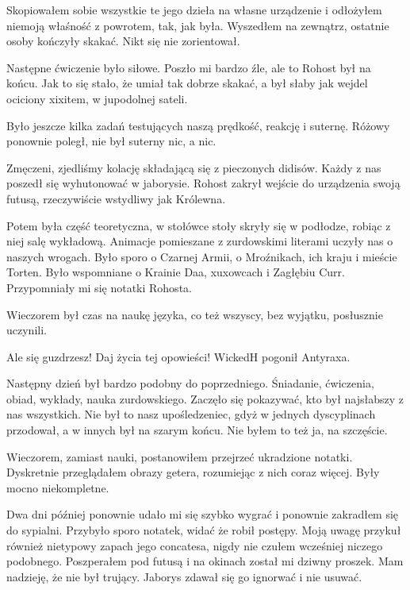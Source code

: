 Skopiowałem sobie wszystkie te jego dzieła na własne urządzenie i odłożyłem niemoją właśność z powrotem, tak, jak była.
Wyszedłem na zewnątrz, ostatnie osoby kończyły skakać. Nikt się nie zorientował.

Następne ćwiczenie było siłowe. 
Poszło mi bardzo źle, ale to Rohost był na końcu.
Jak to się stało, że umiał tak dobrze skakać, a był słaby jak wejdel ociciony xixitem, w jupodolnej sateli.

Było jeszcze kilka zadań testujących naszą prędkość, reakcję i suternę.
Różowy ponownie poległ, nie był suterny nic, a nic.

Zmęczeni, zjedliśmy kolację składającą się z pieczonych didisów.
Każdy z nas poszedł się wyhutonować w jaborysie.
Rohost zakrył wejście do urządzenia swoją futusą, rzeczywiście wstydliwy jak Królewna.

Potem była część teoretyczna, w stołówce stoły skryły się w podłodze, robiąc z niej salę wykładową.
Animacje pomieszane z zurdowskimi literami uczyły nas o naszych wrogach.
Było sporo o Czarnej Armii, o Mroźnikach, ich kraju i mieście Torten. Było wspomniane o Krainie Daa, xuxowcach i Zagłębiu Curr.
Przypomniały mi się notatki Rohosta.

Wieczorem był czas na naukę języka, co też wszyscy, bez wyjątku, posłusznie uczynili.

\divider{}

\begin{dialogue}
\ds{} Ale się guzdrzesz! Daj życia tej opowieści! \dm{} WickedH pogonił Antyraxa.
\end{dialogue}

\divider{}

Następny dzień był bardzo podobny do poprzedniego.
Śniadanie, ćwiczenia, obiad, wykłady, nauka zurdowskiego.
Zaczęło się pokazywać, kto był najsłabszy z nas wszystkich.
Nie był to nasz upośledzeniec, gdyż w jednych dyscyplinach przodował, a w innych był na szarym końcu.
Nie byłem to też ja, na szczęście.

Wieczorem, zamiast nauki, postanowiłem przejrzeć ukradzione notatki.
Dyskretnie przeglądałem obrazy getera, rozumiejąc z nich coraz więcej.
Były mocno niekompletne.

Dwa dni później ponownie udało mi się szybko wygrać i ponownie zakradłem się do sypialni.
Przybyło sporo notatek, widać że robił postępy.
Moją uwagę przykuł również nietypowy zapach jego concatesa, nigdy nie czułem wcześniej niczego podobnego.
Poszperałem pod futusą i na okinach został mi dziwny proszek.
Mam nadzieję, że nie był trujący.
Jaborys zdawał się go ignorwać i nie usuwać.

